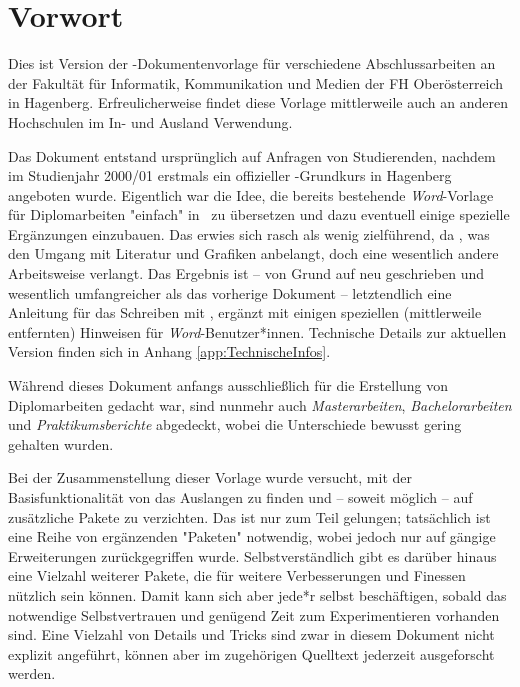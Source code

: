 \chapter{Vorwort} 	%


Dies ist Version \textbf{\hgbDate} der \latex-Doku\-men\-ten\-vor\-la\-ge für
verschiedene Abschlussarbeiten an der Fakultät für Informatik, Kommunikation
und Medien der FH Oberösterreich in Hagenberg. Erfreulicherweise findet
diese Vorlage mittlerweile auch an anderen Hochschulen im In- und Ausland
Verwendung.

Das Dokument entstand ursprünglich auf Anfragen von Studierenden, nachdem im
Studienjahr 2000/01 erstmals ein offizieller \latex-Grundkurs in Hagenberg 
angeboten wurde. Eigentlich war die Idee, die bereits bestehende 
\emph{Word}-Vorlage für Diplomarbeiten "einfach" in \latex\ zu übersetzen 
und dazu eventuell einige spezielle Ergänzungen einzubauen. 
Das erwies sich rasch als wenig zielführend, da
\latex, \va was den Umgang mit Literatur und Grafiken anbelangt, doch eine
wesentlich andere Arbeitsweise verlangt. Das Ergebnis ist -- von Grund auf
neu geschrieben und wesentlich umfangreicher als das vorherige Dokument --
letztendlich eine Anleitung für das Schreiben mit \latex, ergänzt mit einigen
speziellen (mittlerweile entfernten) Hinweisen für \emph{Word}-Benutzer*innen. 
Technische Details zur aktuellen Version finden sich in Anhang
\ref{app:TechnischeInfos}.

Während dieses Dokument anfangs ausschließlich für die Erstellung von
Diplomarbeiten gedacht war, sind nunmehr auch \emph{Masterarbeiten},
\emph{Bachelor\-arbeiten} und \emph{Praktikumsberichte} abgedeckt, wobei die
Unterschiede bewusst gering gehalten wurden.

Bei der Zusammenstellung dieser Vorlage wurde versucht, mit der
Basisfunktionalität von \latex das Auslangen zu finden und -- soweit möglich
-- auf zusätzliche Pakete zu verzichten. Das ist nur zum Teil gelungen;
tat\-säch\-lich ist eine Reihe von ergänzenden "Paketen" notwendig, wobei
jedoch nur auf gängige Erweiterungen zurückgegriffen wurde.
Selbstverständlich gibt es darüber hinaus eine Vielzahl weiterer Pakete, die
für weitere Verbesserungen und Finessen nützlich sein können. Damit kann sich
aber jede*r selbst beschäftigen, sobald das notwendige Selbstvertrauen und
genügend Zeit zum Experimentieren vorhanden sind. Eine Vielzahl von Details
und Tricks sind zwar in diesem Dokument nicht explizit angeführt, können aber
im zugehörigen Quelltext jederzeit ausgeforscht werden.


